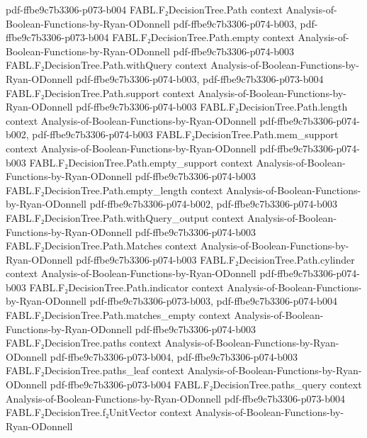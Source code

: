 \begin{theorem}
  {pdf-ffbe9c7b3306-p073-b004}
\proofstep
  {FABL.F₂DecisionTree.Path}
  {context}
  {Analysis-of-Boolean-Functions-by-Ryan-ODonnell}
  {pdf-ffbe9c7b3306-p074-b003,
    pdf-ffbe9c7b3306-p073-b004}
\proofstep
  {FABL.F₂DecisionTree.Path.empty}
  {context}
  {Analysis-of-Boolean-Functions-by-Ryan-ODonnell}
  {pdf-ffbe9c7b3306-p074-b003}
\proofstep
  {FABL.F₂DecisionTree.Path.withQuery}
  {context}
  {Analysis-of-Boolean-Functions-by-Ryan-ODonnell}
  {pdf-ffbe9c7b3306-p074-b003,
    pdf-ffbe9c7b3306-p073-b004}
\proofstep
  {FABL.F₂DecisionTree.Path.support}
  {context}
  {Analysis-of-Boolean-Functions-by-Ryan-ODonnell}
  {pdf-ffbe9c7b3306-p074-b003}
\proofstep
  {FABL.F₂DecisionTree.Path.length}
  {context}
  {Analysis-of-Boolean-Functions-by-Ryan-ODonnell}
  {pdf-ffbe9c7b3306-p074-b002,
    pdf-ffbe9c7b3306-p074-b003}
\proofstep
  {FABL.F₂DecisionTree.Path.mem_support}
  {context}
  {Analysis-of-Boolean-Functions-by-Ryan-ODonnell}
  {pdf-ffbe9c7b3306-p074-b003}
\proofstep
  {FABL.F₂DecisionTree.Path.empty_support}
  {context}
  {Analysis-of-Boolean-Functions-by-Ryan-ODonnell}
  {pdf-ffbe9c7b3306-p074-b003}
\proofstep
  {FABL.F₂DecisionTree.Path.empty_length}
  {context}
  {Analysis-of-Boolean-Functions-by-Ryan-ODonnell}
  {pdf-ffbe9c7b3306-p074-b002,
    pdf-ffbe9c7b3306-p074-b003}
\proofstep
  {FABL.F₂DecisionTree.Path.withQuery_output}
  {context}
  {Analysis-of-Boolean-Functions-by-Ryan-ODonnell}
  {pdf-ffbe9c7b3306-p074-b003}
\proofstep
  {FABL.F₂DecisionTree.Path.Matches}
  {context}
  {Analysis-of-Boolean-Functions-by-Ryan-ODonnell}
  {pdf-ffbe9c7b3306-p074-b003}
\proofstep
  {FABL.F₂DecisionTree.Path.cylinder}
  {context}
  {Analysis-of-Boolean-Functions-by-Ryan-ODonnell}
  {pdf-ffbe9c7b3306-p074-b003}
\proofstep
  {FABL.F₂DecisionTree.Path.indicator}
  {context}
  {Analysis-of-Boolean-Functions-by-Ryan-ODonnell}
  {pdf-ffbe9c7b3306-p073-b003,
    pdf-ffbe9c7b3306-p074-b004}
\proofstep
  {FABL.F₂DecisionTree.Path.matches_empty}
  {context}
  {Analysis-of-Boolean-Functions-by-Ryan-ODonnell}
  {pdf-ffbe9c7b3306-p074-b003}
\proofstep
  {FABL.F₂DecisionTree.paths}
  {context}
  {Analysis-of-Boolean-Functions-by-Ryan-ODonnell}
  {pdf-ffbe9c7b3306-p073-b004,
    pdf-ffbe9c7b3306-p074-b003}
\proofstep
  {FABL.F₂DecisionTree.paths_leaf}
  {context}
  {Analysis-of-Boolean-Functions-by-Ryan-ODonnell}
  {pdf-ffbe9c7b3306-p073-b004}
\proofstep
  {FABL.F₂DecisionTree.paths_query}
  {context}
  {Analysis-of-Boolean-Functions-by-Ryan-ODonnell}
  {pdf-ffbe9c7b3306-p073-b004}
\proofstep
  {FABL.F₂DecisionTree.f₂UnitVector}
  {context}
  {Analysis-of-Boolean-Functions-by-Ryan-ODonnell}

\end{theorem}

